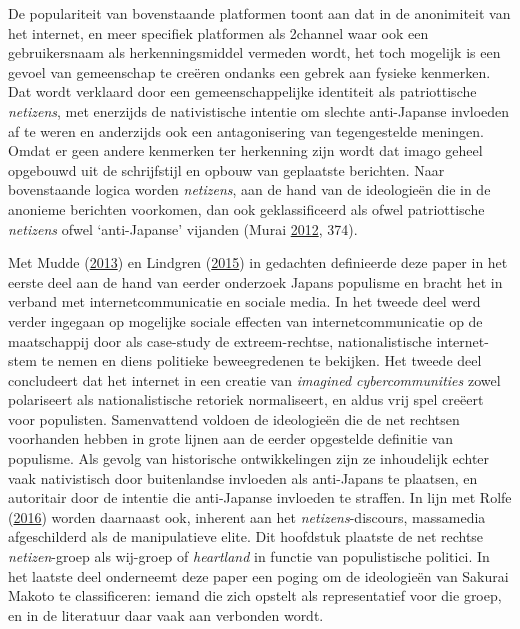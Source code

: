 \documentclass[10.5pt,dutch,]{article}
\begin{document}
De populariteit van bovenstaande platformen toont aan dat in de
anonimiteit van het internet, en meer specifiek platformen als 2channel
waar ook een gebruikersnaam als herkenningsmiddel vermeden wordt, het
toch mogelijk is een gevoel van gemeenschap te creëren ondanks een
gebrek aan fysieke kenmerken. Dat wordt verklaard door een
gemeenschappelijke identiteit als patriottische \emph{netizens}, met
enerzijds de nativistische intentie om slechte anti-Japanse invloeden af
te weren en anderzijds ook een antagonisering van tegengestelde
meningen. Omdat er geen andere kenmerken ter herkenning zijn wordt dat
imago geheel opgebouwd uit de schrijfstijl en opbouw van geplaatste
berichten. Naar bovenstaande logica worden \emph{netizens}, aan de hand
van de ideologieën die in de anonieme berichten voorkomen, dan ook
geklassificeerd als ofwel patriottische \emph{netizens} ofwel
`anti-Japanse' vijanden (Murai
\protect\hyperlink{ref-muraiux5fnetux5f2012}{2012}, 374).

Met Mudde (\protect\hyperlink{ref-muddeux5foxfordux5f2013}{2013}) en
Lindgren (\protect\hyperlink{ref-lindgrenux5fdevelopingux5f2015}{2015})
in gedachten definieerde deze paper in het eerste deel aan de hand van
eerder onderzoek Japans populisme en bracht het in verband met
internetcommunicatie en sociale media. In het tweede deel werd verder
ingegaan op mogelijke sociale effecten van internetcommunicatie op de
maatschappij door als case-study de extreem-rechtse, nationalistische
internet-stem te nemen en diens politieke beweegredenen te bekijken. Het
tweede deel concludeert dat het internet in een creatie van
\emph{imagined cybercommunities} zowel polariseert als nationalistische
retoriek normaliseert, en aldus vrij spel creëert voor populisten.
Samenvattend voldoen de ideologieën die de net rechtsen voorhanden
hebben in grote lijnen aan de eerder opgestelde definitie van populisme.
Als gevolg van historische ontwikkelingen zijn ze inhoudelijk echter
vaak nativistisch door buitenlandse invloeden als anti-Japans te
plaatsen, en autoritair door de intentie die anti-Japanse invloeden te
straffen. In lijn met Rolfe
(\protect\hyperlink{ref-rolfeux5freinventionux5f2016}{2016}) worden
daarnaast ook, inherent aan het \emph{netizens}-discours, massamedia
afgeschilderd als de manipulatieve elite. Dit hoofdstuk plaatste de net
rechtse \emph{netizen}-groep als wij-groep of \emph{heartland} in
functie van populistische politici. In het laatste deel onderneemt deze
paper een poging om de ideologieën van Sakurai Makoto te classificeren:
iemand die zich opstelt als representatief voor die groep, en in de
literatuur daar vaak aan verbonden wordt.
\end{document}
